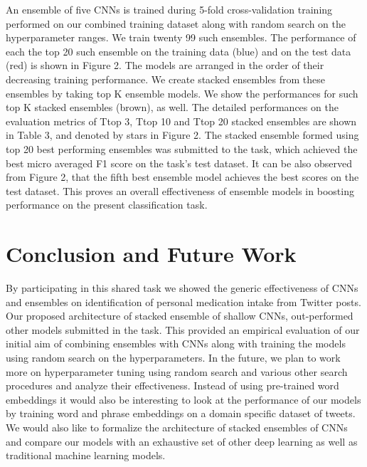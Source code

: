\documentclass[conference]{IEEEtran}
\begin{document}
An ensemble of five CNNs is trained during 5-fold cross-validation training performed on our combined training dataset along with random search on the hyperparameter ranges. We train twenty 99 such ensembles. The performance of each the top 20 such ensemble on the training data (blue) and on the test data (red) is shown in Figure 2. The models are arranged in the order of their decreasing training performance. We create stacked ensembles from these ensembles by taking top K ensemble models. We show the performances for such top K stacked ensembles (brown), as well. The detailed performances on the evaluation metrics of Ttop 3, Ttop 10 and Ttop 20 stacked ensembles are shown in Table 3, and denoted by stars in Figure 2. The stacked ensemble formed using top 20 best performing ensembles was submitted to the task, which achieved the best micro averaged F1 score on the task’s test dataset. It can be also observed from Figure 2, that the fifth best ensemble model achieves the best scores on the test dataset. This proves an overall effectiveness of ensemble models in boosting performance on the present classification task.

\section{Conclusion and Future Work}
By participating in this shared task we showed the generic effectiveness of CNNs and ensembles on identification of personal medication intake from Twitter posts. Our proposed architecture of stacked ensemble of shallow CNNs, out-performed other models submitted in the task. This provided an empirical evaluation of our initial aim of combining ensembles with CNNs along with training the models using random search on the hyperparameters. In the future, we plan to work more on hyperparameter tuning using random search and various other search procedures and analyze their effectiveness. Instead of using pre-trained word embeddings it would also be interesting to look at the performance of our models by training word and phrase embeddings on a domain specific dataset of tweets. We would also like to formalize the architecture of stacked ensembles of CNNs and compare our models with an exhaustive set of other deep learning as well as traditional machine learning models.





\end{document}
